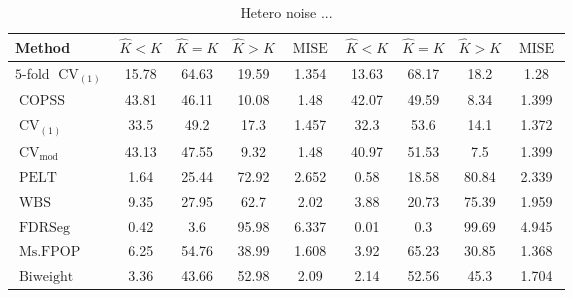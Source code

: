 \begin{table}[ht]
\centering
\begin{tabular}{|l|cccc|cccc|}
  \hline
Method & $\hat{K} < K$ & $\hat{K} = K$ & $\hat{K} > K$ & $\operatorname{MISE}$ & $\hat{K} < K$ & $\hat{K} = K$ & $\hat{K} > K$ & $\operatorname{MISE}$ \\ 
  \hline
$5$-fold $\operatorname{CV}_{(1)}$ & 15.78 & 64.63 & 19.59 & 1.354 & 13.63 & 68.17 &  18.2 &  1.28 \\ 
  $\operatorname{COPSS}$ & 43.81 & 46.11 & 10.08 &  1.48 & 42.07 & 49.59 &  8.34 & 1.399 \\ 
  $\operatorname{CV}_{(1)}$ &  33.5 &  49.2 &  17.3 & 1.457 &  32.3 &  53.6 &  14.1 & 1.372 \\ 
  $\operatorname{CV}_{\operatorname{mod}}$ & 43.13 & 47.55 &  9.32 &  1.48 & 40.97 & 51.53 &   7.5 & 1.399 \\ 
  $\operatorname{PELT}$ &  1.64 & 25.44 & 72.92 & 2.652 &  0.58 & 18.58 & 80.84 & 2.339 \\ 
  $\operatorname{WBS}$ &  9.35 & 27.95 &  62.7 &  2.02 &  3.88 & 20.73 & 75.39 & 1.959 \\ 
  $\operatorname{FDRSeg}$ &  0.42 &   3.6 & 95.98 & 6.337 &  0.01 &   0.3 & 99.69 & 4.945 \\ 
  $\operatorname{Ms.FPOP}$ &  6.25 & 54.76 & 38.99 & 1.608 &  3.92 & 65.23 & 30.85 & 1.368 \\ 
  $\operatorname{Biweight}$ &  3.36 & 43.66 & 52.98 &  2.09 &  2.14 & 52.56 &  45.3 & 1.704 \\ 
   \hline
\end{tabular}
\caption{Hetero noise ...} 
\end{table}
